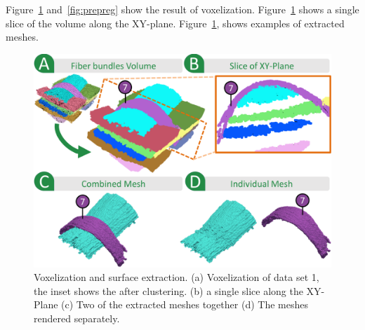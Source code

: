 Figure~\ref{fig:crop-16-decomp} and~\ref{fig:prepreg} show the result of voxelization. Figure~\ref{fig:crop-16-decomp} shows a single slice of the volume along the XY-plane. Figure~\ref{fig:crop-16-decomp}, shows examples of extracted meshes.

\begin{figure}[t]
	\centering
	\includegraphics[width=\linewidth]{images/figure8.eps} 
	\caption{Voxelization and surface extraction. (a) Voxelization of data set 1, the inset shows the \mt after clustering. (b) a single slice along the XY-Plane (c) Two of the extracted meshes together (d) The meshes rendered separately.}
	\label{fig:crop-16-decomp}
\end{figure} 



